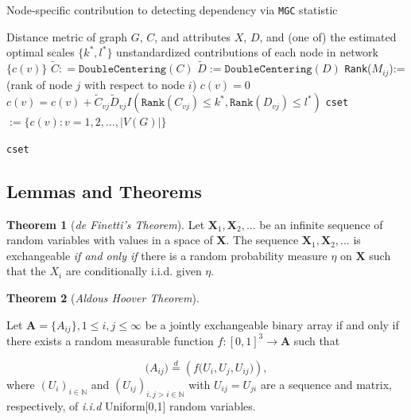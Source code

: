 \documentclass[12pt]{article}
\theoremstyle{definition}
\newtheorem{theorem}{Theorem}[section]
\begin{document}
\begin{algorithm}[H]
	\caption{Node-specific contribution to detecting dependency via \texttt{MGC} statistic}
	\begin{algorithmic}[1]
		\Require Distance metric of graph $G$, $C$, and attributes $X$, $D$, and (one of) the estimated optimal scales $\{ k^{*}, l^{*} \}$ 
		\Ensure  unstandardized contributions of each node in network $\{  c(v) \}$
		\State $\tilde{C} : = \texttt{DoubleCentering}(C)$
		\State $\tilde{D} := \texttt{DoubleCentering}(D)$
		\State \texttt{Rank}($M_{ij}$):= (rank of node $j$ with respect to node $i$)
		 
		\State $c(v) = 0$
		\Begin
		\State $c(v) =  c(v) + \tilde{C}_{vj} \tilde{D}_{v j} I(  \texttt{Rank}(C_{vj})  \leq k^{*}, \texttt{Rank}(D_{vj}) \leq l^{*} )$
		\End
		\EndFor
		\EndFor
		\State \texttt{cset} $:= \{ c(v) : v = 1,2, \ldots , |V(G)|  \}$	
		
		\Return  \texttt{cset}
		\EndFunction
	\end{algorithmic}
\end{algorithm}

\newpage
\subsection{Lemmas and Theorems}
	
\begin{theorem}[\textit{de Finetti's Theorem}] 
\label{finetti}	
\bigskip			
Let $\mathbf{X}_{1}, \mathbf{X}_{2}, ...$ be an infinite sequence of random variables with values in a space of $\mathbf{X}$. The sequence $\mathbf{X}_{1}, \mathbf{X}_{2}, ...$ is exchangeable \textit{if and only if} there is a random probability measure $\eta$ on $\mathbf{X}$ such that the $X_{i}$ are conditionally i.i.d. given $\eta$. 
\end{theorem}
	
\begin{theorem}[\textit{Aldous Hoover Theorem}]
		\label{Aldous_Hoover}
		
Let $\mathbf{A} = \{A_{ij}\}, 1 \leq i,j \leq \infty$ be a jointly exchangeable binary array if and only if there exists a random measurable function $f : [0,1]^{3} \rightarrow \mathbf{A}$ such that 
		
\begin{equation}
	\big(  A_{ij}  \big) \stackrel{d}{=} \left( f \big( U_{i}, U_{j}, U_{ij} \big)  \right),
\end{equation}
		where $(U_{i})_{i \in \mathbb{N}}$ and $(U_{ij})_{i,j > i \in \mathbb{N}}$ with $U_{ij} = U_{ji}$ are a sequence and matrix, respectively, of \textit{i.i.d} Uniform[0,1] random variables. 
\end{theorem}
	
\end{document}
